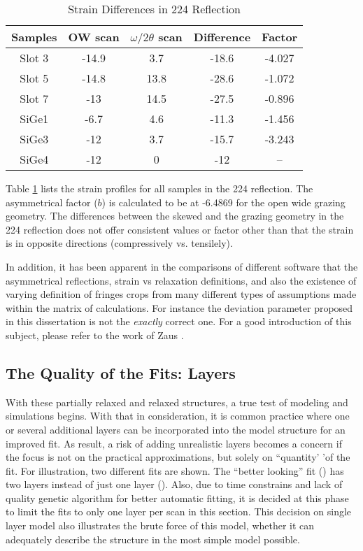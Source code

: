 \begin{table}[h]
\centering
\caption{Strain Differences in 224 Reflection}
\label{diff224}
\begin{tabular}{c|cccc}
Samples  & OW scan & $\omega/2\theta$ scan & Difference & Factor\\
\hline
  Slot 3 & -14.9 & 3.7 &-18.6 & -4.027\\
 Slot 5&-14.8&13.8& -28.6 & -1.072\\
Slot 7&-13&14.5 & -27.5 & -0.896\\
SiGe1&-6.7&4.6 & -11.3 & -1.456\\
SiGe3&-12&3.7 & -15.7 & -3.243\\
SiGe4&-12&0 & -12 & --\\
\end{tabular}
\end{table}

Table \ref{diff224} lists the strain profiles for all samples in the 224 reflection.  The asymmetrical factor ($b$) is calculated to be at -6.4869 for the open wide grazing geometry.  The differences between the skewed and the grazing geometry in the 224 reflection does not offer consistent values or factor other than that the strain is in opposite directions (compressively vs. tensilely).


In addition,  it has been apparent in the comparisons of different software that the asymmetrical reflections, strain vs relaxation definitions, and also the existence of varying definition of fringes crops from many different types of assumptions made within the matrix of calculations.  For instance the deviation parameter proposed in this dissertation is not the \emph{exactly} correct one.  For a good introduction of this subject, please refer to the work of Zaus \cite{Zaus1}.

\subsection{The Quality of the Fits: Layers}

With these partially relaxed and relaxed structures, a true test of modeling and simulations begins.  With that in consideration, it is common practice where one or several additional layers can be incorporated into the model structure for an improved fit.  As result, a risk of adding unrealistic layers becomes a concern if the focus is not on the practical approximations, but solely on ``quantity' 'of the fit.   For illustration, two different fits are shown.  The ``better looking'' fit () has two layers instead of just one layer ().  Also, due to time constrains and lack of quality genetic algorithm for better automatic fitting, it is decided at this phase to limit the fits to only one layer per scan in this section.  This decision on single layer model also illustrates the brute force of this model, whether it can adequately describe the structure in the most simple model possible.

